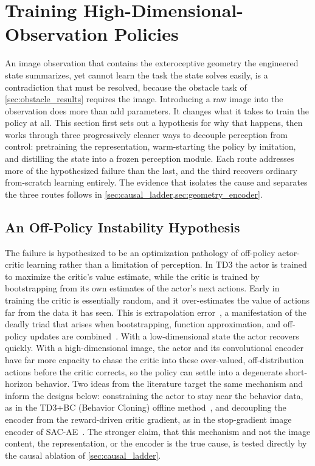 \section{Training High-Dimensional-Observation Policies}
\label{sec:highdim_training}
\label{sec:vision}

An image observation that contains the exteroceptive geometry the engineered state summarizes, yet cannot learn the task the state solves easily, is a contradiction that must be resolved, because the obstacle task of \cref{sec:obstacle_results} requires the image. Introducing a raw image into the observation does more than add parameters. It changes what it takes to train the policy at all. This section first sets out a hypothesis for why that happens, then works through three progressively cleaner ways to decouple perception from control: pretraining the representation, warm-starting the policy by imitation, and distilling the state into a frozen perception module. Each route addresses more of the hypothesized failure than the last, and the third recovers ordinary from-scratch learning entirely. The evidence that isolates the cause and separates the three routes follows in \cref{sec:causal_ladder,sec:geometry_encoder}.

\subsection{An Off-Policy Instability Hypothesis}

The failure is hypothesized to be an optimization pathology of off-policy actor-critic learning rather than a limitation of perception. In TD3 the actor is trained to maximize the critic's value estimate, while the critic is trained by bootstrapping from its own estimates of the actor's next actions. Early in training the critic is essentially random, and it over-estimates the value of actions far from the data it has seen. This is extrapolation error~\cite{fujimoto2019bcq}, a manifestation of the deadly triad that arises when bootstrapping, function approximation, and off-policy updates are combined~\cite{sutton2018rl}. With a low-dimensional state the actor recovers quickly. With a high-dimensional image, the actor and its convolutional encoder have far more capacity to chase the critic into these over-valued, off-distribution actions before the critic corrects, so the policy can settle into a degenerate short-horizon behavior. Two ideas from the literature target the same mechanism and inform the designs below: constraining the actor to stay near the behavior data, as in the TD3+BC (Behavior Cloning) offline method~\cite{fujimoto2021td3bc}, and decoupling the encoder from the reward-driven critic gradient, as in the stop-gradient image encoder of SAC-AE~\cite{yarats2021sacae}. The stronger claim, that this mechanism and not the image content, the representation, or the encoder is the true cause, is tested directly by the causal ablation of \cref{sec:causal_ladder}.

